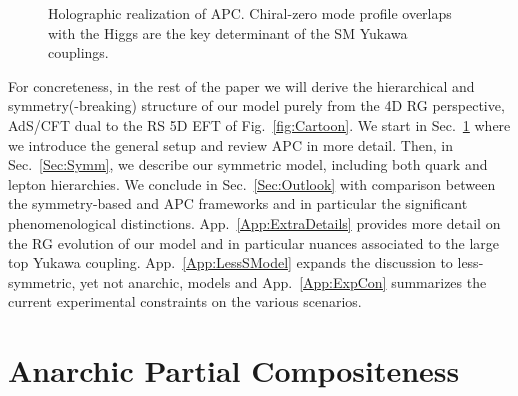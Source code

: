 \documentclass[aps,prl,twocolumn,showpacs,10pt,preprintnumbers,nofootinbib]{revtex4-2}
\newcommand{\mst}{m_*}
\newcommand{\LUV}{\Lambda_{\text{UV}}}
\begin{document}
\begin{figure}[t!]   %

  \caption{Holographic realization of APC. Chiral-zero mode profile overlaps with the Higgs are the key determinant of the SM Yukawa couplings.}
  \label{fig:CartoonAnarchy}
\end{figure}

For concreteness, in the rest of the paper we will derive the hierarchical and symmetry(-breaking) structure of our model purely from the 4D RG perspective, AdS/CFT dual to the RS 5D EFT of Fig.~\ref{fig:Cartoon}. We start in Sec.~\ref{Sec:Anarchy} where we introduce the general setup and review APC in more detail. Then, in Sec.~\ref{Sec:Symm}, we describe our symmetric model, including both quark and lepton hierarchies. We conclude in Sec.~\ref{Sec:Outlook} with comparison between the symmetry-based and APC frameworks and in particular the significant phenomenological distinctions. App.~\ref{App:ExtraDetails} provides more detail on the RG evolution of our model and in particular nuances associated to the large top Yukawa coupling. App.~\ref{App:LessSModel} expands the discussion to less-symmetric, yet not anarchic, models and App.~\ref{App:ExpCon} summarizes the current experimental constraints on the various scenarios.

\section{Anarchic Partial Compositeness}\label{Sec:Anarchy}
\end{document}
